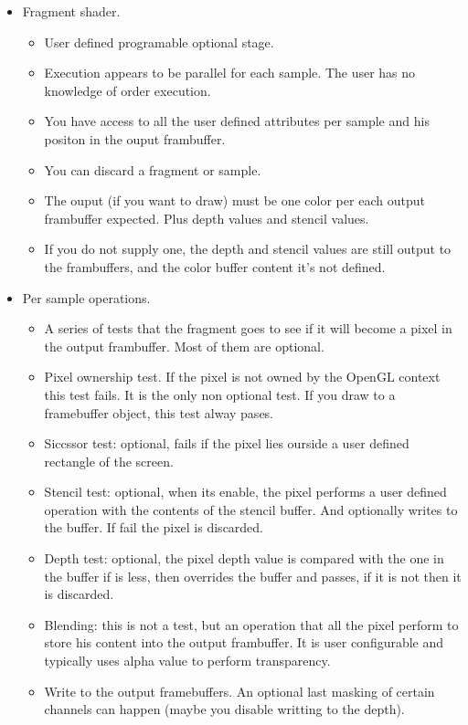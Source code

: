 \begin{itemize}
 \item Fragment shader.
 \begin{itemize}
  \item User defined programable optional stage.
  \item Execution appears to be parallel for each sample. The user has no knowledge of order execution.
  \item You have access to all the user defined attributes per sample and his positon in the ouput frambuffer.
  \item You can discard a fragment or sample.
  \item The ouput (if you want to draw) must be one color per each output frambuffer expected. Plus depth values and stencil values. 
  \item If you do not supply one, the depth and stencil values are still output to the frambuffers, and the color buffer content it's not defined.
 \end{itemize}

 \item Per sample operations.
 \begin{itemize}
  \item A series of tests that the fragment goes to see if it will become a pixel in the output frambuffer. Most of them are optional.
  \item Pixel ownership test. If the pixel is not owned by the OpenGL context this test fails. It is the only non optional test. If you draw to a framebuffer object, this test alway pases.
  \item Siccssor test: optional, fails if the pixel lies ourside a user defined rectangle of the screen.
  \item Stencil test: optional, when its enable, the pixel performs a user defined operation with the contents of the stencil buffer. And optionally writes to the buffer. If fail the pixel is discarded.
  \item Depth test: optional, the pixel depth value is compared with the one in the buffer if is less, then overrides the buffer and passes, if it is not then it is discarded.
  \item Blending: this is not a test, but an operation that all the pixel perform to store his content into the output frambuffer. It is user configurable and typically uses alpha value to perform transparency.
  \item Write to the output framebuffers. An optional last masking of certain channels can happen (maybe you disable writting to the depth).
 \end{itemize}

\end{itemize}


